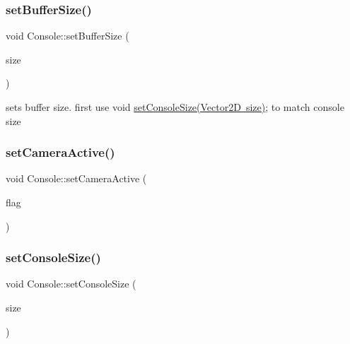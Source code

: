 \mbox{\label{classsc_1_1_console_abc2f735f5b6f81a6356b4cd26f237ade}} 
\subsubsection{\texorpdfstring{setBufferSize()}{setBufferSize()}}
{\footnotesize\ttfamily void Console\+::set\+Buffer\+Size (\begin{DoxyParamCaption}\item[{\mbox{\hyperlink{classsc_1_1_vector2_d}{Vector2D}}}]{size }\end{DoxyParamCaption})}



sets buffer size. first use void \mbox{\hyperlink{classsc_1_1_console_ab503eab53751fde4f1e27c6f6901e794}{set\+Console\+Size(\+Vector2\+D size)}}; to match console size 

\mbox{\label{classsc_1_1_console_aa50c09dfc2a61531e5bb12456819485a}} 
\subsubsection{\texorpdfstring{setCameraActive()}{setCameraActive()}}
{\footnotesize\ttfamily void Console\+::set\+Camera\+Active (\begin{DoxyParamCaption}\item[{bool}]{flag }\end{DoxyParamCaption})}

\mbox{\label{classsc_1_1_console_ab503eab53751fde4f1e27c6f6901e794}} 
\subsubsection{\texorpdfstring{setConsoleSize()}{setConsoleSize()}}
{\footnotesize\ttfamily void Console\+::set\+Console\+Size (\begin{DoxyParamCaption}\item[{\mbox{\hyperlink{classsc_1_1_vector2_d}{Vector2D}}}]{size }\end{DoxyParamCaption})}



